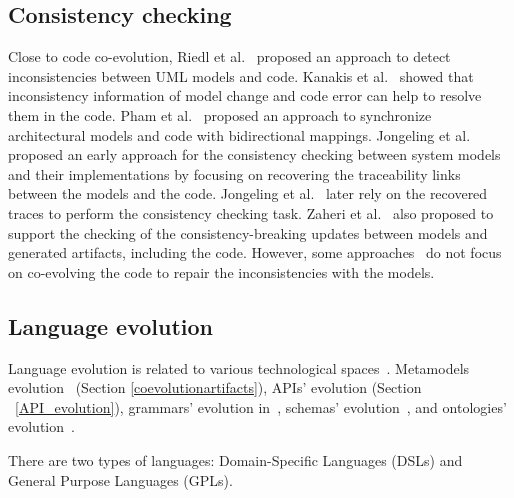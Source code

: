  \subsection{Consistency checking }
 \label{Consistency_checking}
  Close to code co-evolution, Riedl et al.~\cite{riedl2014towards} proposed an approach to detect inconsistencies between UML models and code. Kanakis et al.~\cite{kanakis2019empirical} showed that inconsistency information of model change and code error can help to resolve them in the code.%
 Pham et al.~\cite{pham2017bidirectional} proposed an approach to synchronize architectural models and code with bidirectional mappings.
 Jongeling et al.~\cite{jongeling2020towards} proposed an early approach for the consistency checking between system models and their implementations by focusing on recovering the traceability links between the models and the code. Jongeling et al.~\cite{jongeling2022Structural} later rely on the recovered traces to perform the consistency checking task.  %
 Zaheri et al.~\cite{zaheri2021towards} also proposed to support the checking of the consistency-breaking updates between models and generated artifacts, including the code. However, some approaches~\cite{pham2017bidirectional,jongeling2020towards,jongeling2022Structural,zaheri2021towards} do not focus on co-evolving the code to repair the inconsistencies with the models. 
 \subsection{Language evolution}
 
Language evolution is related to  various technological spaces~\cite{ivanov2002technological}. Metamodels evolution~\cite{favre2003meta} (Section \ref{coevolutionartifacts}), APIs' evolution \cite{dig2006apis} (Section ~\ref{API_evolution}), grammars' evolution in~\cite{5279907}, schemas' evolution~\cite{lammel2001format,meyer1996schema}, and ontologies' evolution~\cite{flouris2008ontology}.
  
   There are two types of languages: Domain-Specific Languages (DSLs) and General Purpose Languages (GPLs). 
   

